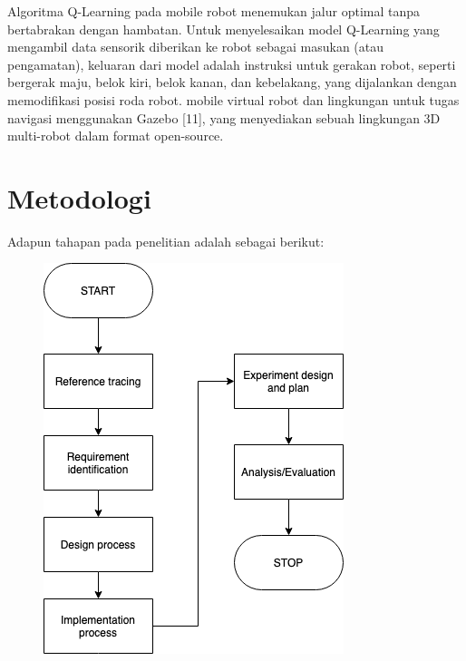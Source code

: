 Algoritma Q-Learning pada mobile robot menemukan jalur optimal tanpa bertabrakan dengan hambatan. Untuk menyelesaikan model Q-Learning yang mengambil data sensorik diberikan ke robot sebagai masukan (atau pengamatan), keluaran dari model adalah instruksi untuk gerakan robot, seperti bergerak maju, belok kiri, belok kanan, dan kebelakang, yang dijalankan dengan memodifikasi posisi roda robot. mobile virtual robot dan lingkungan untuk tugas navigasi menggunakan Gazebo [11], yang menyediakan sebuah lingkungan 3D multi-robot dalam format open-source.


\section{Metodologi}

Adapun tahapan pada penelitian adalah sebagai berikut:

\begin{figure}[H]
	\centering
	\includegraphics[width=0.7\linewidth]{figure/Metode-Penelitian-flow.png}
	\caption[Metode Penelitian]{}
	\label{fig:metode-penelitian-flow}
\end{figure}


